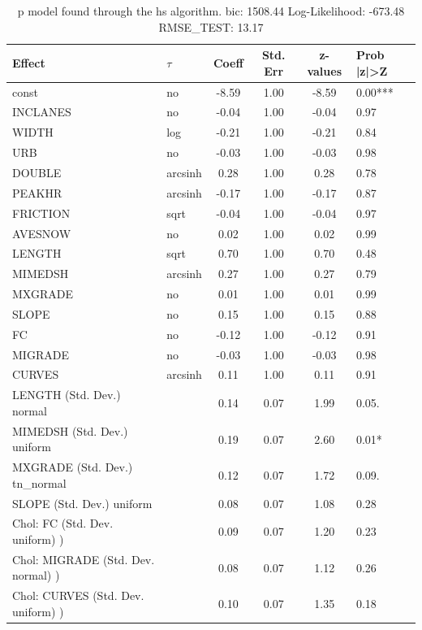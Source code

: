 \begin{table}
	\caption{p model found through the hs algorithm. bic: 1508.44 Log-Likelihood: -673.48 RMSE_TEST: 13.17}
	\begin{center}
		\begin{tabular}{|l|l|c|c|c|l|}
			\hline
			Effect & $\tau$ & Coeff & Std. Err & z-values & Prob |z|>Z \\
			\hline
			const & no & -8.59 & 1.00 & -8.59 & 0.00*** \\
			\hline
			INCLANES & no & -0.04 & 1.00 & -0.04 & 0.97 \\
			\hline
			WIDTH & log & -0.21 & 1.00 & -0.21 & 0.84 \\
			\hline
			URB & no & -0.03 & 1.00 & -0.03 & 0.98 \\
			\hline
			DOUBLE & arcsinh & 0.28 & 1.00 & 0.28 & 0.78 \\
			\hline
			PEAKHR & arcsinh & -0.17 & 1.00 & -0.17 & 0.87 \\
			\hline
			FRICTION & sqrt & -0.04 & 1.00 & -0.04 & 0.97 \\
			\hline
			AVESNOW & no & 0.02 & 1.00 & 0.02 & 0.99 \\
			\hline
			LENGTH & sqrt & 0.70 & 1.00 & 0.70 & 0.48 \\
			\hline
			MIMEDSH & arcsinh & 0.27 & 1.00 & 0.27 & 0.79 \\
			\hline
			MXGRADE & no & 0.01 & 1.00 & 0.01 & 0.99 \\
			\hline
			SLOPE & no & 0.15 & 1.00 & 0.15 & 0.88 \\
			\hline
			FC & no & -0.12 & 1.00 & -0.12 & 0.91 \\
			\hline
			MIGRADE & no & -0.03 & 1.00 & -0.03 & 0.98 \\
			\hline
			CURVES & arcsinh & 0.11 & 1.00 & 0.11 & 0.91 \\
			\hline
			LENGTH (Std. Dev.) normal &  & 0.14 & 0.07 & 1.99 & 0.05. \\
			\hline
			MIMEDSH (Std. Dev.) uniform &  & 0.19 & 0.07 & 2.60 & 0.01* \\
			\hline
			MXGRADE (Std. Dev.) tn_normal &  & 0.12 & 0.07 & 1.72 & 0.09. \\
			\hline
			SLOPE (Std. Dev.) uniform &  & 0.08 & 0.07 & 1.08 & 0.28 \\
			\hline
			 Chol: FC (Std. Dev. uniform) ) &  & 0.09 & 0.07 & 1.20 & 0.23 \\
			\hline
			 Chol: MIGRADE (Std. Dev. normal) ) &  & 0.08 & 0.07 & 1.12 & 0.26 \\
			\hline
			 Chol: CURVES (Std. Dev. uniform) ) &  & 0.10 & 0.07 & 1.35 & 0.18 \\

\end{tabular}
\end{center}
\end{table}
